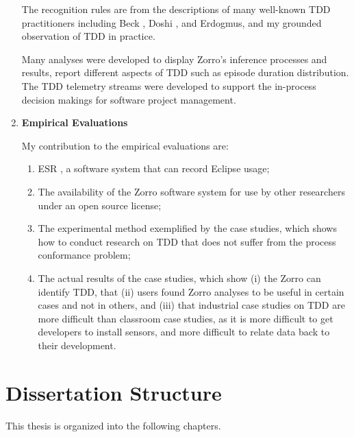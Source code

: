 \begin{enumerate}
The recognition rules are from the descriptions of many well-known TDD practitioners including Beck \cite{Beck:03}, Doshi \cite{TDDQuickReference}, and Erdogmus, and my grounded observation of TDD in practice. 

Many analyses were developed to display Zorro's inference processes and results, report different aspects of TDD such as episode duration distribution. The TDD telemetry streams were developed to support the in-process decision makings for software project management.  

\item \textbf{Empirical Evaluations}

My contribution to the empirical evaluations are:
\begin{enumerate}
\item ESR \cite{esr}, a software system that can record Eclipse usage; 
\item The availability of the Zorro software system for use by other researchers under an open source license;

\item The experimental method exemplified by the case studies, which shows how to conduct research on TDD that does not suffer from the process conformance problem;

\item The actual results of the case studies, which show (i) the Zorro can identify TDD, that (ii) users found Zorro analyses to be useful in certain cases and not in others, and (iii) that industrial case studies on TDD are more difficult than classroom case studies, as it is more difficult to get developers to install sensors, and more difficult to relate data back to their development.

\end{enumerate}
\end{enumerate}

\section{Dissertation Structure}

This thesis is organized into the following chapters. 

